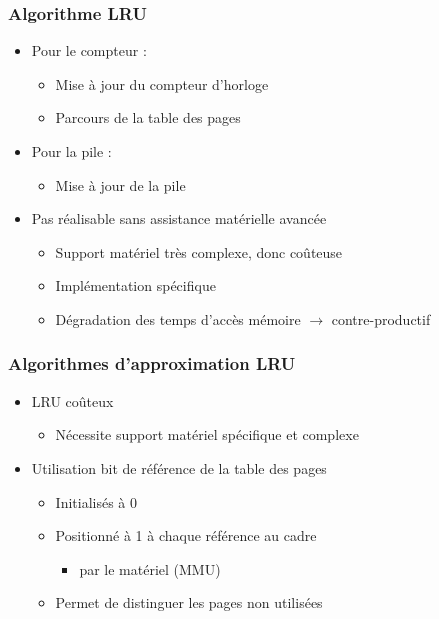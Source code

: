 \begin{frame}
\frametitle{Algorithme LRU}
\begin{itemize}
\item Pour le compteur :
\begin{itemize}
\item Mise à jour du compteur d'horloge
\item Parcours de la table des pages
\end{itemize}
\item Pour la pile :
\begin{itemize}
\item Mise à jour de la pile
\end{itemize}
\item Pas réalisable sans assistance matérielle avancée
\begin{itemize}
\item Support matériel très complexe, donc coûteuse
\item Implémentation spécifique
\item Dégradation des temps d'accès mémoire $\rightarrow$ contre-productif
\end{itemize}
\end{itemize}
\end{frame}


\begin{frame}
\frametitle{Algorithmes d'approximation LRU}
\begin{itemize}
\item LRU coûteux
\begin{itemize}
\item Nécessite support matériel spécifique et complexe
\end{itemize}
\item Utilisation bit de référence de la table des pages
\begin{itemize}
\item Initialisés à 0
\item Positionné à 1 à chaque référence au cadre
\begin{itemize}
\item par le matériel (MMU)
\end{itemize}
\item Permet de distinguer les pages non utilisées
\end{itemize}
\end{itemize}
\end{frame}



